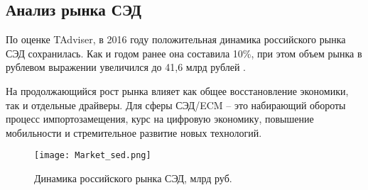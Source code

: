 \subsection{Анализ рынка СЭД}
\label{sec:analysis:sed_market}

По оценке TAdviser, в 2016 году положительная динамика российского рынка СЭД сохранилась. Как и годом ранее она составила 10\%, при этом объем рынка в рублевом выражении увеличился до 41,6 млрд рублей \cite{tadviser_market1}.

На продолжающийся рост рынка влияет как общее восстановление экономики, так и отдельные драйверы. Для сферы СЭД/ECM – это набирающий обороты процесс импортозамещения, курс на цифровую экономику, повышение мобильности и стремительное развитие новых технологий.

\begin{figure}[h!]
\centering
	\texttt{[image: Market\_sed.png]}
	\caption{Динамика российского рынка СЭД, млрд руб.}
\end{figure}
\clearpage
